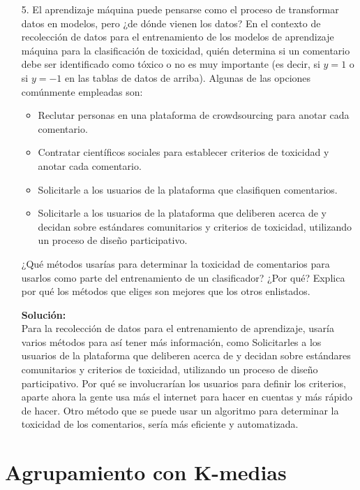\documentclass[11pt,letterpaper]{article}
\newenvironment{solution}{%
  \noindent\begin{shaded}
  \textbf{Solución:}\ }{
  \end{shaded}%
}
\begin{document}
\begin{enumerate}
  \item[5.]
  El aprendizaje máquina puede pensarse como el proceso de transformar datos en modelos, pero ¿de dónde vienen los datos? En el contexto de recolección de datos para el entrenamiento de los modelos de aprendizaje máquina para la clasificación de toxicidad, quién determina si un comentario debe ser identificado como tóxico o no es muy importante (es decir, si $y = 1$ o si $y = -1$ en las tablas de datos de arriba). Algunas de las opciones comúnmente empleadas son:
\begin{itemize}
    \item Reclutar personas en una plataforma de crowdsourcing para anotar cada comentario.
    \item Contratar científicos sociales para establecer criterios de toxicidad y anotar cada comentario.
    \item Solicitarle a los usuarios de la plataforma que clasifiquen comentarios.
    \item Solicitarle a los usuarios de la plataforma que deliberen acerca de y decidan sobre estándares comunitarios y criterios de toxicidad, utilizando un proceso de diseño participativo.
\end{itemize}
¿Qué métodos usarías para determinar la toxicidad de comentarios para usarlos como parte del entrenamiento de un clasificador? ¿Por qué? Explica por qué los métodos que eliges son mejores que los otros enlistados.
\begin{solution}
\\ Para la recolección de datos para el entrenamiento de aprendizaje, usaría varios métodos para así tener más información, como Solicitarles a los usuarios de la plataforma que deliberen acerca de y decidan sobre estándares comunitarios y criterios de toxicidad, utilizando un proceso de diseño participativo. Por qué se involucrarían los usuarios para definir los criterios, aparte ahora la gente usa más el internet para hacer en cuentas y más rápido de hacer. Otro método que se puede usar un algoritmo para determinar la toxicidad de los comentarios, sería más eficiente y automatizada.

    
\end{solution}
  
\end{enumerate}



\section*{Agrupamiento con K-medias}
\end{document}
